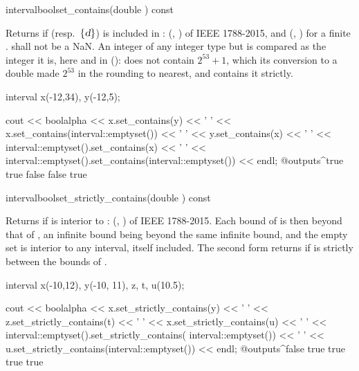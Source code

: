 \documentclass[12pt,a4paper,twoside,openright]{book}
\begin{document}
\begin{defmethod}{interval}{bool}{set\_contains}{(double ) const}
  \begin{operation}
  \end{operation}
  Returns  if  (resp.\ $\{\textsl{d}\}$) is included in
  : (, ) of IEEE 1788-2015, and
  (, ) for a finite .  shall
  not be a NaN. An integer of any integer type but  is compared as
  the integer it is, here and in 
  ():  does not contain $2^{53}+1$,
  which its conversion to a double made $2^{53}$ in the rounding to nearest,
  and  contains it strictly.\newinvfive

\begin{example}
interval x(-12,34), y(-12,5);

cout << boolalpha << x.set_contains(y) << ' '
     << x.set_contains(interval::emptyset()) << ' '
     << y.set_contains(x) << ' '
     << interval::emptyset().set_contains(x) << ' '
     << interval::emptyset().set_contains(interval::emptyset())
     << endl;
@outputs^true true false false true~
\end{example}
\end{defmethod}

\begin{defmethod}{interval}{bool}{set\_strictly\_contains}{(double ) const}
  \begin{operation}
  \end{operation}
  Returns  if  is interior to :
  (, ) of IEEE 1788-2015. Each bound of
   is then beyond that of , an infinite bound being beyond
  the same infinite bound, and the empty set is interior to any interval,
  itself included.\newinvfive{} The second form returns  if
   is strictly between the bounds of .

\begin{example}
interval x(-10,12), y(-10, 11), z, t, u(10.5);

cout << boolalpha
     << x.set_strictly_contains(y) << ' '
     << z.set_strictly_contains(t) << ' '
     << x.set_strictly_contains(u) << ' '
     << interval::emptyset().set_strictly_contains(
                                 interval::emptyset()) << ' '
     << u.set_strictly_contains(interval::emptyset())
     << endl;
@outputs^false true true true true~
\end{example}
\end{defmethod}
\end{document}
